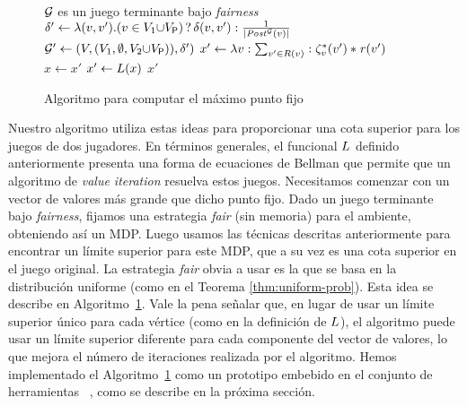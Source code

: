 \begin{figure}
    \centering
    \begin{minipage}{0.75\textwidth}
      \begin{algorithm}[H]
      \SetAlgoLined
      \KwOut{$\nu \Bellman$}
        \caption{Algoritmo para computar el máximo punto fijo}\label{Alg:gfp}
        \begin{algorithmic}
          \REQUIRE $\mathcal{G}$ es un juego terminante bajo \textit{fairness}\\[1ex]
          \STATE $\delta' \gets  \lambda (v,v') {.} (v \in V_1 {\cup} V_{\mathsf{P}}) \mathop{?} \delta(v,v') : \frac{1}{|\mathit{Post}^{\mathcal{G}}(v)|}$\\[-1ex]
          \STATE  $\mathcal{G}' \gets (V, (V_1, \emptyset, V_2{\cup}V_{\mathsf{P}})), \delta')$
          \STATE $x' \gets \lambda v : \sum_{v' \in R(v)} : \zeta^*_v(v')*\mathit{r}(v')$
          \REPEAT
          \STATE $x \gets x'$
          \STATE $x' \gets L(x)$
          \RETURN $x'$
        \end{algorithmic}
      \end{algorithm}
    \end{minipage}
  \end{figure}
    Nuestro algoritmo utiliza estas ideas para proporcionar una cota superior para los juegos de dos jugadores. En términos generales, el funcional $L$ definido anteriormente presenta una forma de ecuaciones de Bellman que permite que un algoritmo de \emph{value iteration} resuelva estos juegos. Necesitamos comenzar con un vector de valores más grande que dicho punto fijo. Dado un juego terminante bajo \textit{fairness}, fijamos una estrategia \textit{fair} (sin memoria) para el ambiente, obteniendo así un MDP. Luego usamos las técnicas descritas anteriormente para encontrar un límite superior para este MDP, que a su vez es una cota superior en el juego original. La estrategia \textit{fair} obvia a usar es la que se basa en la distribución uniforme (como en el Teorema \ref{thm:uniform-prob}). Esta idea se describe en Algoritmo~\ref{Alg:gfp}. Vale la pena señalar que, en lugar de usar un límite superior único para cada vértice (como en la definición de $L$), el algoritmo puede usar un límite superior diferente para cada componente del vector de valores, lo que mejora el número de iteraciones realizada por el algoritmo.
Hemos implementado el Algoritmo~\ref{Alg:gfp} como un prototipo embebido en el conjunto de herramientas {\PrismGames} ~\cite{DBLP:conf/cav/KwiatkowskaN0S20}, 
como se describe en la próxima sección. 



